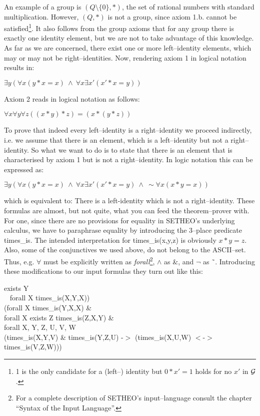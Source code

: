 An example of a group is $(Q\setminus \{0\},*)$, the set of rational numbers with
standard multiplication. However, $(Q,*)$ is not a group, since axiom 1.b. cannot
be satisfied\footnote{1 is the only candidate for a (left--) identity but
$0 * x' = 1$ holds for no $x'$ in $\cal G$.}.
It also follows from the group axioms that  for any group there is exactly
one identity element, but we are not to take advantage of this knowledge.
As far as we are concerned, there
exist one or more left--identity elements, which may or may not be right--identities.
Now, rendering axiom 1 in logical notation results in:
\begin{center}
	$\exists y (\forall x  (y * x = x) \:\wedge\: \forall x  \exists x' (x' * x = y))$
\end{center} 
Axiom 2 reads in logical notation as follows:
\begin{center}
	$\forall x \forall y \forall z  ((x * y) * z) = (x * (y * z))$
\end{center} 
To prove that indeed every left--identity is a right--identity we proceed
indirectly, i.e. we assume that there is an element, which is a left--identity 
but not a right--identity.
So what we want to do is to state that there is an element that is characterised by axiom 1
but is not a right--identity.
In logic notation this can be expressed as:
\begin{center}
	$\exists y (\forall x  (y * x = x) \:\wedge\: \forall x  \exists x' (x' * x = y) \:\wedge\:  \sim \forall x  (x * y = x))$
\end{center} 
which is equivalent to: There is a left-identity which is not a right--identity.
These formulas are almost, but not quite, what you can feed the theorem--prover with.
For one, since there are no provisions for equality in SETHEO's underlying calculus,
we have to paraphrase equality by introducing the 3--place predicate times\_is. The intended
interpretation for times\_is(x,y,z) is obviously $x * y = z$. Also, some of the conjunctives
we used above, do not belong to the ASCII--set. Thus, e.g. $\forall$ must be explicitly
written as {\it forall\/}\footnote{For a complete description of SETHEO's input--language consult
the chapter ``Syntax of the Input Language''.},
$\wedge$ as \&, and $\neg$ as \~\ .
Introducing these modifications to our input formulas they
turn out like this:
\\
\begin{tabbing}
exists Y \= \\
          \> ~ forall X times\_is(X,Y,X)) \\
          \> (forall X  times\_is(Y,X,X) \& \\
          \> forall X exists Z times\_is(Z,X,Y) \& \\
forall X, Y, Z, U, V, W \\
          \>(times\_is(X,Y,V) \& times\_is(Y,Z,U) -$>$ (times\_is(X,U,W) $<$-$>$ times\_is(V,Z,W)))
\end{tabbing}
